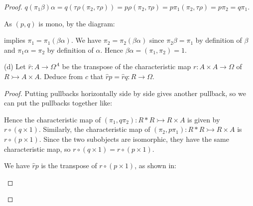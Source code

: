 \documentclass[a4paper]{article}
\begin{document}
\begin{proof}
    $q(\pi_1\beta)\alpha=q(\tau\rho(\pi_2,\tau\rho))=p\rho(\pi_2,\tau\rho)=p\pi_1(\pi_2,\tau\rho)=p\pi_2=q\pi_1$.

    As $(p,q)$ is mono, by the diagram:

    \begin{center}
    \end{center}

    implies $\pi_1=\pi_1(\beta\alpha)$. We have $\pi_2 = \pi_2(\beta\alpha)$ since $\pi_2\beta = \pi_1$ by definition of $\beta$ and $\pi_1\alpha = \pi_2$ by definition of $\alpha$. Hence $\beta\alpha = (\pi_1,\pi_2)=1$.

    (d) Let $\hat{r}:A\to\Omega^A$ be the transpose of the characteristic map $r:A\times A\to\Omega$ of $R\rightarrowtail A\times A$. Deduce from $c$ that $\hat{r}p=\hat{r}q:R\to \Omega$.

    \begin{proof}
        Putting pullbacks horizontally side by side gives another pullback, so we can put the pullbacks together like:

        \begin{center}
        \end{center}

        Hence the characteristic map of $(\pi_1,q\pi_2):R*R\rightarrowtail R\times A$ is given by $r\circ (q\times 1)$. Similarly, the characteristic map of $(\pi_2,p\pi_1):R*R\rightarrowtail R\times A$ is $r\circ (p\times 1)$. Since the two subobjects are isomorphic, they have the same characteristic map, so $r\circ (q\times 1)= r\circ (p\times 1)$.

        We have $\hat{r}p$ is the transpose of $r\circ (p\times 1)$, as shown in:

        \begin{center}
        \end{center}


\end{proof}
\end{proof}
\end{document}
